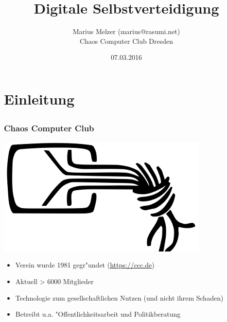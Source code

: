 \documentclass[12pt]{beamer}
\title{Digitale Selbstverteidigung}
\author{\small Marius Melzer (marius@rasumi.net) \\\large Chaos Computer Club Dresden}
\date{07.03.2016}
\begin{document}
\maketitle

\section{Einleitung}
\subsection{}

\begin{frame}
    \frametitle{Chaos Computer Club}
    \begin{center}
	\includegraphics[height=0.2\textheight]{img/chaosknoten.png}
    \end{center}	
    \begin{itemize}
      \item<1-> Verein wurde 1981 gegr"undet (\url{https://ccc.de})
      \item<2-> Aktuell > 6000 Mitglieder
      \item<3-> Technologie zum gesellschaftlichen Nutzen (und nicht ihrem Schaden)
      \item<4-> Betreibt u.a. "Offentlichkeitsarbeit und Politikberatung
    \end{itemize}
\end{frame}
\end{document}

